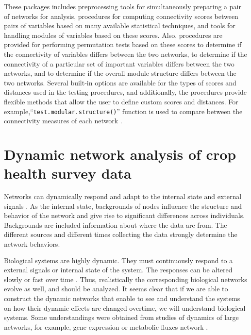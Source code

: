 \begin{enumerate}
These packages includes preprocessing tools for simultaneously preparing a pair of networks for analysis, procedures for computing connectivity scores between pairs of variables based on many available statistical techniques, and tools for handling modules of variables based on these scores. Also, procedures are provided for performing permutation tests based on these scores to determine if the connectivity of variables differs between the two networks, to determine if the connectivity of a particular set of important variables differs between the two networks, and to determine if the overall module structure differs between the two networks. Several built-in options are available for the types of scores and distances used in the testing procedures, and additionally, the procedures provide flexible methods that allow the user to define custom scores and distances. For example,``\texttt{test.modular.structure()}'' function is used to compare between the connectivity measures of each network . 



 

\section*{Dynamic network analysis of crop health survey data}
Networks can dynamically respond and adapt to the internal state and external signals . As the internal state, backgrounds of nodes influence the structure and behavior of the network and give rise to significant differences across individuals. Backgrounds are included information about where the data are from. The different sources and different times collecting the data strongly determine the network behaviors. 


Biological systems are highly dynamic. They must continuously respond to a external signals or internal state of the system. The responses can be altered slowly or fast over time . Thus, realistically the corresponding biological networks evolve as well, and should be analyzed.  It seems clear that if we are able to construct the dynamic networks that enable to see and understand the systems on how their dynamic effects are changed overtime, we will understand biological systems. Some understandings were obtained from studies of dynamics of large networks, for example, gene expression or metabolic fluxes network .
 

\end{enumerate}
